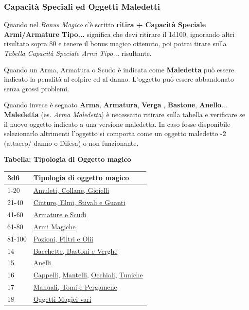 \begin{multicols}{2}
{\subsubsection{Capacità Speciali ed Oggetti Maledetti}

Quando nel \emph{Bonus Magico} c'è scritto \textbf{ritira + Capacità Speciale Armi/Armature Tipo...} significa che devi ritirare il 1d100, ignorando altri risultato sopra 80 e tenere il bonus magico ottenuto, poi potrai tirare sulla \emph{Tabella Capacità Speciale Armi Tipo...} risultante.

Quando un Arma, Armatura o Scudo è indicata come \textbf{Maledetta} può essere indicato la penalità al colpire ed al danno. L'oggetto può essere abbandonato senza grossi problemi.

Quando invece è segnato \textbf{Arma}, \textbf{Armatura}, \textbf{Verga} , \textbf{Bastone}, \textbf{Anello}... \textbf{Maledetta} (es. \emph{Arma Maledetta}) è necessario ritirare sulla tabella e verificare se il nuovo oggetto indicato a una versione maledetta. In caso fosse disponibile selezionarlo altrimenti l'oggetto si comporta come un oggetto maledetto -2 (attacco/ danno o Difesa) o non funzionante.\hypertarget{Arma Maledetta}{}\hypertarget{Maledetta}{}\hypertarget{Armatura Maledetta}{}

\medskip

\textbf{Tabella: Tipologia di Oggetto magico}\label{tipologiaoggettomagico}\hypertarget{tipologiaoggettomagico}{}

{\small \begin{tabularx}{\linewidth}{ll}
		\toprule
\textbf{3d6}& \textbf{Tipologia di oggetto magico}\\
\toprule
1-20 &\hyperlink{amuleticollanegioielli}{Amuleti, Collane, Gioielli}\\
21-40 &\hyperlink{cintureelmi}{Cinture, Elmi, Stivali e Guanti}\\
41-60 &\hyperlink{armatureescudi}{Armature e Scudi}\\
61-80 &\hyperlink{armimagiche}{Armi Magiche}\\
81-100 &\hyperlink{pozionifiltri}{Pozioni, Filtri e Olii}\\
14&\hyperlink{bastonibacchette}{Bacchette, Bastoni e Verghe}\\
15&\hyperlink{anellimagici}{Anelli}\\
16&\hyperlink{Cappelli}{Cappelli}, \hyperlink{Mantelli}{Mantelli}, \hyperlink{OcchialidaNotte}{Occhiali}, \hyperlink{Tuniche}{Tuniche}\\
17&\hyperlink{manualitomi}{Manuali, Tomi e Pergamene}\\
18&\hyperlink{oggettimagicivari}{Oggetti Magici vari}
\end{tabularx}}

}
\end{multicols}
